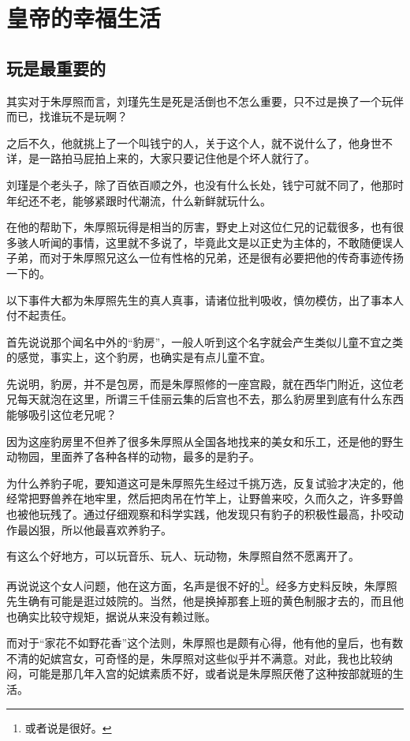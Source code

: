 \section{皇帝的幸福生活}
\ifnum{}
	\begin{multicols}{\theparacolNo}
\fi
\subsection{玩是最重要的}
其实对于朱厚照而言，刘瑾先生是死是活倒也不怎么重要，只不过是换了一个玩伴而已，找谁玩不是玩啊？

之后不久，他就挑上了一个叫钱宁的人，关于这个人，就不说什么了，他身世不详，是一路拍马屁拍上来的，大家只要记住他是个坏人就行了。

刘瑾是个老头子，除了百依百顺之外，也没有什么长处，钱宁可就不同了，他那时年纪还不老，能够紧跟时代潮流，什么新鲜就玩什么。

在他的帮助下，朱厚照玩得是相当的厉害，野史上对这位仁兄的记载很多，也有很多骇人听闻的事情，这里就不多说了，毕竟此文是以正史为主体的，不敢随便误人子弟，而对于朱厚照兄这么一位有性格的兄弟，还是很有必要把他的传奇事迹传扬一下的。

以下事件大都为朱厚照先生的真人真事，请诸位批判吸收，慎勿模仿，出了事本人付不起责任。

首先说说那个闻名中外的“豹房”，一般人听到这个名字就会产生类似儿童不宜之类的感觉，事实上，这个豹房，也确实是有点儿童不宜。

先说明，豹房，并不是包房，而是朱厚照修的一座宫殿，就在西华门附近，这位老兄每天就泡在这里，所谓三千佳丽云集的后宫也不去，那么豹房里到底有什么东西能够吸引这位老兄呢？

因为这座豹房里不但养了很多朱厚照从全国各地找来的美女和乐工，还是他的野生动物园，里面养了各种各样的动物，最多的是豹子。

为什么养豹子呢，要知道这可是朱厚照先生经过千挑万选，反复试验才决定的，他经常把野兽养在地牢里，然后把肉吊在竹竿上，让野兽来咬，久而久之，许多野兽也被他玩残了。通过仔细观察和科学实践，他发现只有豹子的积极性最高，扑咬动作最凶狠，所以他最喜欢养豹子。

有这么个好地方，可以玩音乐、玩人、玩动物，朱厚照自然不愿离开了。

再说说这个女人问题，他在这方面，名声是很不好的\footnote{或者说是很好。}。经多方史料反映，朱厚照先生确有可能是逛过妓院的。当然，他是换掉那套上班的黄色制服才去的，而且他也确实比较守规矩，据说从来没有赖过账。

而对于“家花不如野花香”这个法则，朱厚照也是颇有心得，他有他的皇后，也有数不清的妃嫔宫女，可奇怪的是，朱厚照对这些似乎并不满意。对此，我也比较纳闷，可能是那几年入宫的妃嫔素质不好，或者说是朱厚照厌倦了这种按部就班的生活。


\end{multicols}
